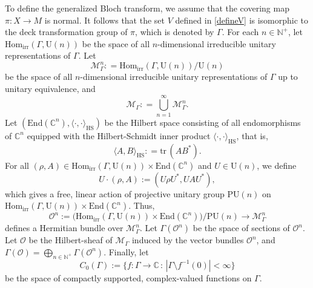 \documentclass[11pt,oneside,reqno]{amsart}
\theoremstyle{definition}
\numberwithin{equation}{section}
\theoremstyle{plain}
\begin{document}
To define the generalized Bloch transform, we assume that the covering map $\pi:X\rightarrow M$ is normal. It follows that the set $V$ defined in \eqref{defineV} is isomorphic to the deck transformation group of $\pi$, which is denoted by $\Gamma$. For each $n \in \mathbb{N}^+$, let $\mathrm{Hom}_{\mathrm{irr}}(\Gamma,\mathrm{U}(n))$ be the space of all $n$-dimensional irreducible unitary representations of $\Gamma$. Let
\begin{equation}
    \mathcal{M}^n_{\Gamma}: = \mathrm{Hom}_{\mathrm{irr}}(\Gamma,\mathrm{U}(n))/\mathrm{U}(n)
\end{equation}
be the space of all $n$-dimensional irreducible unitary representations of $\Gamma$ up to unitary equivalence, and
\begin{equation*}
   \mathcal{M}_{\Gamma} : = \bigcup_{n=1}^{\infty} \mathcal{M}^n_{\Gamma}.
\end{equation*}
Let $(\mathrm{End}(\mathbb{C}^n),\langle \cdot,\cdot\rangle_{\mathrm{HS}})$ be the Hilbert space consisting of all endomorphisms of $\mathbb{C}^n$ equipped with the Hilbert-Schmidt inner product $\langle \cdot,\cdot\rangle_{\mathrm{HS}}$, that is,
\begin{equation}
    \langle A, B\rangle_{\mathrm{HS}}: = \mathrm{tr}\,(AB^*).
\end{equation}
For all $(\rho,A)  \in \mathrm{Hom}_{\mathrm{irr}}(\Gamma, \mathrm{U}(n)) \times \mathrm{End}(\mathbb{C}^n)$ and $U \in \mathrm{U}(n)$, we define 
\begin{equation}
    U \cdot (\rho, A) := ( U\rho U^*, UA U^* ),
\end{equation}
which gives a free, linear action of projective unitary group $\mathrm{PU}(n)$ on 
$\mathrm{Hom}_{\mathrm{irr}}(\Gamma, \mathrm{U}(n)) \times \mathrm{End}(\mathbb{C}^n) $. Thus,
\begin{equation} \label{eq:On}
\mathscr{O}^n := \big( \mathrm{Hom}_{\mathrm{irr}}(\Gamma, \mathrm{U}(n)) \times \mathrm{End}(\mathbb{C}^n) \big) \big/ \mathrm{PU}(n) \longrightarrow \mathcal{M}^n_{\Gamma}
\end{equation}
defines a Hermitian bundle over $\mathcal{M}^n_{\Gamma}$. Let $\Gamma(\mathscr{O}^n)$ be the space of sections of $\mathscr{O}^n$. Let $\mathscr{O}$ be the Hilbert-sheaf of $\mathcal{M}_{\Gamma}$ induced by the vector bundles $\mathscr{O}^n$, and $\Gamma(\mathscr{O}) =\bigoplus\limits_{n\in \mathbb{N}^+}\Gamma(\mathscr{O}^n)$. Finally, let
\begin{equation*}
    C_0(\Gamma) := \bigl\{ f : \Gamma \to \mathbb{C} \,:\, |\Gamma \setminus f^{-1}(0) | < \infty\bigr\}
\end{equation*}
be the space of compactly supported, complex-valued functions on $\Gamma$. 
\end{document}
